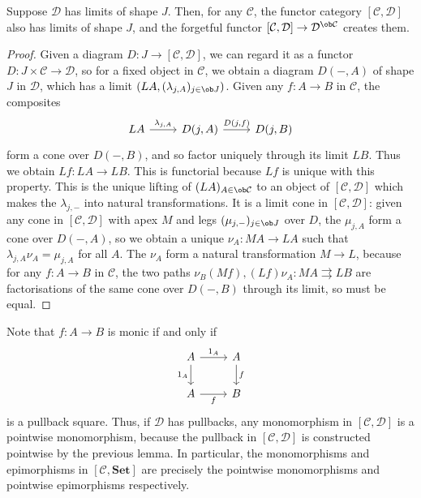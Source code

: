 \begin{lemma}
    Suppose \( \mathcal D \) has limits of shape \( J \).
    Then, for any \( \mathcal C \), the functor category \( [\mathcal C, \mathcal D] \) also has limits of shape \( J \), and the forgetful functor \( [\mathcal C, \mathcal D] \to \mathcal D^{\ob \mathcal C} \) creates them.
\end{lemma}
\begin{proof}
    Given a diagram \( D : J \to [\mathcal C, \mathcal D] \), we can regard it as a functor \( D : J \times \mathcal C \to \mathcal D \), so for a fixed object in \( \mathcal C \), we obtain a diagram \( D(-, A) \) of shape \( J \) in \( \mathcal D \), which has a limit \( (LA, (\lambda_{j,A})_{j \in \ob J}) \).
    Given any \( f : A \to B \) in \( \mathcal C \), the composites
\[\begin{tikzcd}
	LA & {D(j,A)} & {D(j,B)}
	\arrow["{\lambda_{j,A}}", from=1-1, to=1-2]
	\arrow["{D(j,f)}", from=1-2, to=1-3]
\end{tikzcd}\]
    form a cone over \( D(-, B) \), and so factor uniquely through its limit \( LB \).
    Thus we obtain \( Lf : LA \to LB \).
    This is functorial because \( Lf \) is unique with this property.
    This is the unique lifting of \( (LA)_{A \in \ob \mathcal C} \) to an object of \( [\mathcal C, \mathcal D] \) which makes the \( \lambda_{j,-} \) into natural transformations.
    It is a limit cone in \( [\mathcal C, \mathcal D] \): given any cone in \( [\mathcal C, \mathcal D] \) with apex \( M \) and legs \( (\mu_{j,-})_{j \in \ob J} \) over \( D \), the \( \mu_{j,A} \) form a cone over \( D(-, A) \), so we obtain a unique \( \nu_A : MA \to LA \) such that \( \lambda_{j,A} \nu_A = \mu_{j,A} \) for all \( A \).
    The \( \nu_A \) form a natural transformation \( M \to L \), because for any \( f : A \to B \) in \( \mathcal C \), the two paths \( \nu_B(Mf), (Lf)\nu_A : MA \rightrightarrows LB \) are factorisations of the same cone over \( D(-, B) \) through its limit, so must be equal.
\end{proof}
\begin{remark}
    Note that \( f : A \to B \) is monic if and only if
\[\begin{tikzcd}
	A & A \\
	A & B
	\arrow["{1_A}", from=1-1, to=1-2]
	\arrow["f", from=1-2, to=2-2]
	\arrow["{1_A}"', from=1-1, to=2-1]
	\arrow["f"', from=2-1, to=2-2]
\end{tikzcd}\]
    is a pullback square.
    Thus, if \( \mathcal D \) has pullbacks, any monomorphism in \( [\mathcal C, \mathcal D] \) is a pointwise monomorphism, because the pullback in \( [\mathcal C, \mathcal D] \) is constructed pointwise by the previous lemma.
    In particular, the monomorphisms and epimorphisms in \( [\mathcal C, \mathbf{Set}] \) are precisely the pointwise monomorphisms and pointwise epimorphisms respectively.
\end{remark}

